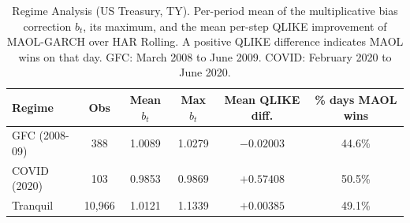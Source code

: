 \begin{table}[H]
\centering
\caption{Regime Analysis (US Treasury, TY). Per-period mean of the multiplicative bias correction $b_t$, its maximum, and the mean per-step QLIKE improvement of MAOL-GARCH over HAR Rolling. A positive QLIKE difference indicates MAOL wins on that day. GFC: March 2008 to June 2009. COVID: February 2020 to June 2020.}
\label{tab:regime_analysis}
\small
\begin{tabular}{lccccc}
\toprule
Regime & Obs & Mean $b_t$ & Max $b_t$ & Mean QLIKE diff. & \% days MAOL wins \\
\midrule
GFC (2008-09) & 388 & 1.0089 & 1.0279 & $-0.02003$ & 44.6\% \\
COVID (2020) & 103 & 0.9853 & 0.9869 & $+0.57408$ & 50.5\% \\
Tranquil & 10,966 & 1.0121 & 1.1339 & $+0.00385$ & 49.1\% \\
\bottomrule
\end{tabular}
\end{table}
